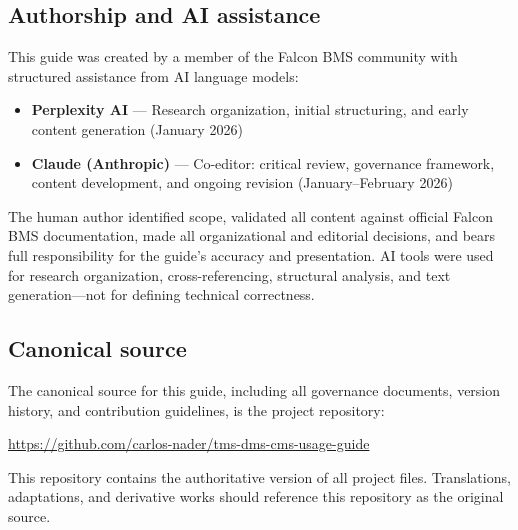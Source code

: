 \documentclass[11pt, a4paper, twoside]{report}
\begin{document}
\subsection{Authorship and AI assistance}
\label{sec:C1-S4-S2}

This guide was created by a member of the Falcon BMS community with structured assistance from AI language models:

\begin{itemize}
	\item \textbf{Perplexity AI} --- Research organization, initial structuring, and early content generation (January 2026)
	\item \textbf{Claude (Anthropic)} --- Co-editor: critical review, governance framework, content development, and ongoing revision (January--February 2026)
\end{itemize}

The human author identified scope, validated all content against official Falcon BMS documentation, made all organizational and editorial decisions, and bears full responsibility for the guide's accuracy and presentation. AI tools were used for research organization, cross-referencing, structural analysis, and text generation---not for defining technical correctness.

\subsection{Canonical source}
\label{sec:C1-S4-S3}

The canonical source for this guide, including all governance documents, version history, and contribution guidelines, is the project repository:

\begin{center}
	\url{https://github.com/carlos-nader/tms-dms-cms-usage-guide}
\end{center}

This repository contains the authoritative version of all project files. Translations, adaptations, and derivative works should reference this repository as the original source.
\end{document}
